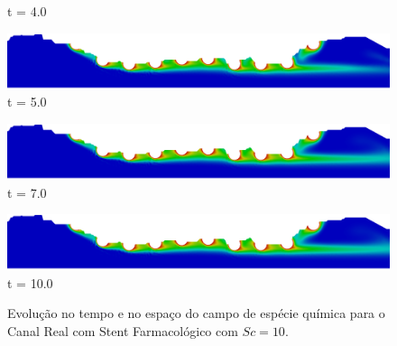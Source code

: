\begin{figure}[H]
\begin{minipage}{.50\linewidth}
      t = 4.0
     \end{minipage}%
     \begin{minipage}{.50\linewidth}
      \centering
      \includegraphics[scale=0.115]{./02_chaps/cap_solution/figure/conc10_RealStrut25000.png}\\
      t = 5.0
     \end{minipage}
     \begin{minipage}{.50\linewidth}
     \medskip
      \centering
      \includegraphics[scale=0.115]{./02_chaps/cap_solution/figure/conc10_RealStrut35000.png}\\
      t = 7.0
     \end{minipage}%
     \begin{minipage}{.50\linewidth}
     \medskip
      \centering
      \includegraphics[scale=0.115]{./02_chaps/cap_solution/figure/conc10_RealStrut50000.png}\\
      t = 10.0
     \end{minipage}
     \medskip
     \caption{Evolução no tempo e no espaço do campo de espécie química para o Canal Real com Stent Farmacológico com $Sc=10$.}
     \label{conc field real stent sc 10}
\end{figure}


\newpage


